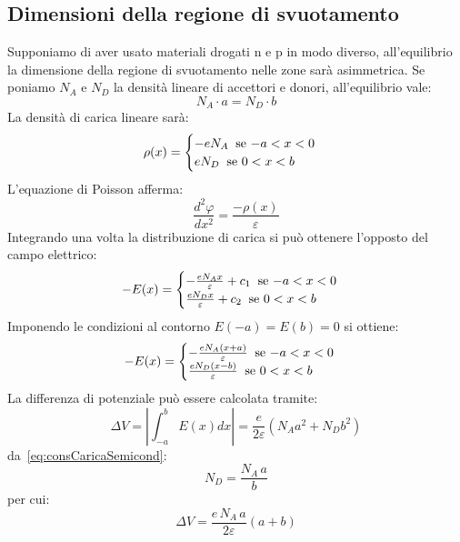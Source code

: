 \subsection{Dimensioni della regione di svuotamento}
Supponiamo di aver usato materiali drogati n e p in modo diverso, all'equilibrio la dimensione della regione di svuotamento nelle zone sar\`a asimmetrica.
Se poniamo $N_A$ e $N_D$ la densit\`a lineare di accettori e donori, all'equilibrio vale:
\begin{equation}\label{eq:consCaricaSemicond}
N_A \cdot a = N_D \cdot b
\end{equation}
La densit\`a di carica lineare sar\`a:
\begin{equation*}
\rho (x) = 
\begin{cases}
-e N_A \; \; $se $-a<x<0\\
e N_D \; \; $se $0<x<b
\end{cases}
\end{equation*}
L'equazione di Poisson afferma:
\begin{equation*}
\frac{d^2 \varphi}{dx^2} = \frac{-\rho(x)}{\varepsilon}
\end{equation*}
Integrando una volta la distribuzione di carica si pu\`o ottenere l'opposto del campo elettrico:
\begin{equation*}
-E (x) = 
\begin{cases}
-\frac{e N_A x}{\varepsilon} + c_1 \; \; $se $-a<x<0\\
\frac{e N_D x}{\varepsilon} + c_2 \; \; $se $0<x<b
\end{cases}
\end{equation*}
Imponendo le condizioni al contorno $E(-a)=E(b)=0$ si ottiene:
\begin{equation*}
-E (x) = 
\begin{cases}
-\frac{e N_A (x+a)}{\varepsilon}  \; \; $se $-a<x<0\\
\frac{e N_D (x-b)}{\varepsilon}  \; \; $se $0<x<b
\end{cases}
\end{equation*}
La differenza di potenziale pu\`o essere calcolata tramite:
\begin{equation*}
\Delta V = \left| \int_{-a}^{b} E(x) dx \right| = \frac{e}{2 \varepsilon}(N_A a^2 + N_D b^2)
\end{equation*}
da~\ref{eq:consCaricaSemicond}:
\begin{equation*}
N_D = \frac{N_A \, a}{b}
\end{equation*}
per cui:
\begin{equation*}
\Delta V = \frac{e \, N_A \, a}{2 \varepsilon}(a + b)
\end{equation*}
